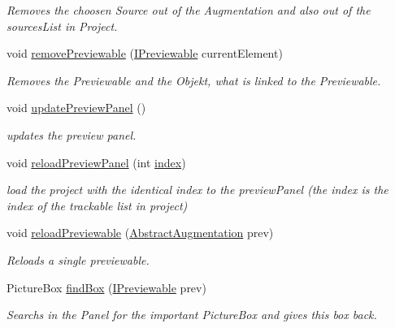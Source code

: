 \begin{DoxyCompactItemize}
\begin{DoxyCompactList}\small\item\em Removes the choosen Source out of the Augmentation and also out of the sources\-List in Project. \end{DoxyCompactList}\item 
void \hyperlink{class_preview_controller_a73d864a5cea6519a889d70bffbfef8f9}{remove\-Previewable} (\hyperlink{interface_a_rdev_kit_1_1_model_1_1_project_1_1_i_previewable}{I\-Previewable} current\-Element)
\begin{DoxyCompactList}\small\item\em Removes the Previewable and the Objekt, what is linked to the Previewable. \end{DoxyCompactList}\item 
void \hyperlink{class_preview_controller_a5dd2e4dfcb87bcb1b2290d4ea752db2c}{update\-Preview\-Panel} ()
\begin{DoxyCompactList}\small\item\em updates the preview panel. \end{DoxyCompactList}\item 
void \hyperlink{class_preview_controller_ab68e5dc968561b4a115576d84e363cb0}{reload\-Preview\-Panel} (int \hyperlink{class_preview_controller_a9b9691005cc484c0da1d7498e72b8e7f}{index})
\begin{DoxyCompactList}\small\item\em load the project with the identical index to the preview\-Panel (the index is the index of the trackable list in project) \end{DoxyCompactList}\item 
void \hyperlink{class_preview_controller_a497bb0aabb76d17df7d090fd0b8daac5}{reload\-Previewable} (\hyperlink{class_a_rdev_kit_1_1_model_1_1_project_1_1_abstract_augmentation}{Abstract\-Augmentation} prev)
\begin{DoxyCompactList}\small\item\em Reloads a single previewable. \end{DoxyCompactList}\item 
Picture\-Box \hyperlink{class_preview_controller_a4ab1b4464e39eeb347554fc69f0dd38b}{find\-Box} (\hyperlink{interface_a_rdev_kit_1_1_model_1_1_project_1_1_i_previewable}{I\-Previewable} prev)
\begin{DoxyCompactList}\small\item\em Searchs in the Panel for the important Picture\-Box and gives this box back. \end{DoxyCompactList}\item 

\end{DoxyCompactItemize}
